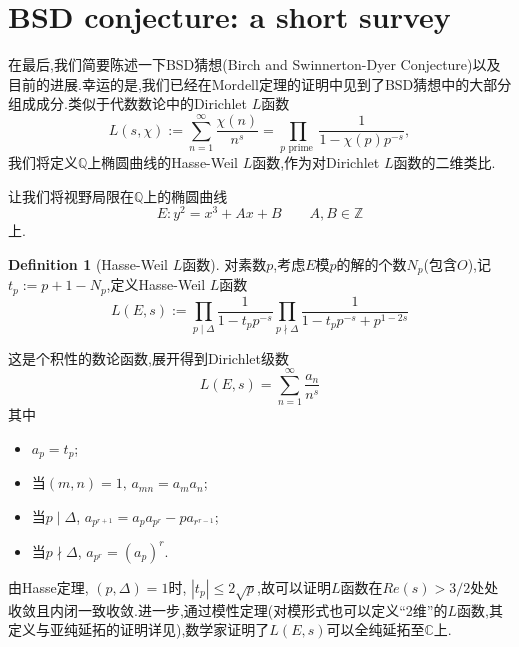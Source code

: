 \documentclass[12pt,A4paper,oneside,reqno]{amsart}
\numberwithin{equation}{section}
\theoremstyle{definition}
\newtheorem{defn}[theorem]{Definition}
\theoremstyle{plain}
\theoremstyle{plain}
\numberwithin{equation}{section}
\theoremstyle{remark}
\begin{document}
\section{BSD conjecture: a short survey}
在最后,我们简要陈述一下BSD猜想(Birch and Swinnerton-Dyer Conjecture)以及目前的进展.幸运的是,我们已经在Mordell定理的证明中见到了BSD猜想中的大部分组成成分.类似于代数数论中的Dirichlet $L$函数
$$L(s,\chi):=\sum_{n=1}^{\infty}\frac{\chi(n)}{n^s}=\prod_{p \text{ prime }} \frac{1}{1-\chi(p)p^{-s}}, $$
我们将定义$\mathbb{Q}$上椭圆曲线的Hasse-Weil $L$函数,作为对Dirichlet $L$函数的二维类比.

让我们将视野局限在$\mathbb{Q}$上的椭圆曲线
$$E:y^2=x^3+Ax+B \qquad A,B \in \mathbb{Z}$$
上.
\begin{defn}[Hasse-Weil $L$函数]
	对素数$p$,考虑$E$模$p$的解的个数$N_p$(包含$O$),记$t_p:=p+1-N_p$,定义Hasse-Weil $L$函数
	$$L(E,s):=\prod_{p \mid \Delta} \frac{1}{1-t_pp^{-s}} \prod_{p \nmid \Delta} \frac{1}{1-t_pp^{-s}+p^{1-2s}}$$
\end{defn}
这是个积性的数论函数,展开得到Dirichlet级数
$$L(E,s)=\sum_{n=1}^{\infty}\frac{a_n}{n^s}$$
其中
\begin{itemize}
	\item $a_p=t_p$;
	\item 当$(m,n)=1,\,a_{mn}=a_ma_n$;
	\item 当$p \mid \Delta$, $a_{p^{r+1}}=a_pa_{p^r}-pa_{r^{r-1}}$;
	\item []当$p \nmid \Delta$, $a_{p^{r}}=(a_p)^r$.
\end{itemize}
由Hasse定理, $(p,\Delta)=1$时, $|t_p| \leqslant 2\sqrt{p}$,故可以证明$L$函数在$Re(s)>3/2$处处收敛且内闭一致收敛.进一步,通过模性定理\cite{breuil2001modularity}(对模形式也可以定义“2维”的$L$函数,其定义与亚纯延拓的证明详见\cite[p32-33]{bump1998automorphic}),数学家证明了$L(E,s)$可以全纯延拓至$\mathbb{C}$上.
\end{document}
